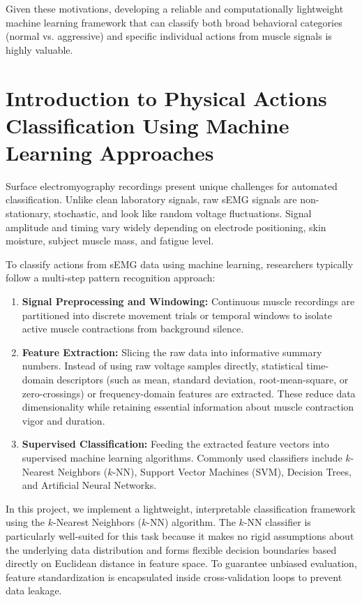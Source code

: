 \documentclass[journal]{IEEEtran}
\begin{document}
Given these motivations, developing a reliable and computationally lightweight machine learning framework that can classify both broad behavioral categories (normal vs. aggressive) and specific individual actions from muscle signals is highly valuable.

\section{Introduction to Physical Actions Classification Using Machine Learning Approaches}
Surface electromyography recordings present unique challenges for automated classification. Unlike clean laboratory signals, raw sEMG signals are non-stationary, stochastic, and look like random voltage fluctuations. Signal amplitude and timing vary widely depending on electrode positioning, skin moisture, subject muscle mass, and fatigue level.

To classify actions from sEMG data using machine learning, researchers typically follow a multi-step pattern recognition approach:
\begin{enumerate}
    \item \textbf{Signal Preprocessing and Windowing:} Continuous muscle recordings are partitioned into discrete movement trials or temporal windows to isolate active muscle contractions from background silence.
    \item \textbf{Feature Extraction:} Slicing the raw data into informative summary numbers. Instead of using raw voltage samples directly, statistical time-domain descriptors (such as mean, standard deviation, root-mean-square, or zero-crossings) or frequency-domain features are extracted. These reduce data dimensionality while retaining essential information about muscle contraction vigor and duration.
    \item \textbf{Supervised Classification:} Feeding the extracted feature vectors into supervised machine learning algorithms. Commonly used classifiers include $k$-Nearest Neighbors ($k$-NN), Support Vector Machines (SVM), Decision Trees, and Artificial Neural Networks.
\end{enumerate}

In this project, we implement a lightweight, interpretable classification framework using the $k$-Nearest Neighbors ($k$-NN) algorithm. The $k$-NN classifier is particularly well-suited for this task because it makes no rigid assumptions about the underlying data distribution and forms flexible decision boundaries based directly on Euclidean distance in feature space. To guarantee unbiased evaluation, feature standardization is encapsulated inside cross-validation loops to prevent data leakage.
\end{document}
